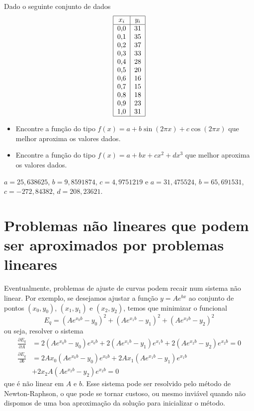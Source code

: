 \documentclass[main.tex]{subfiles}
\begin{document}
\begin{Exercise} Dado o seguinte conjunto de dados
  \begin{equation*}
    \begin{tabular}{|c|c|}
      \hline
      $x_i$ & $y_i$\\
      \hline
      0,0 &  31\\
      0,1 &  35\\
      0,2 &  37\\
      0,3 &  33\\
      0,4 &  28\\
      0,5 &  20\\
      0,6 &  16\\
      0,7 &  15\\
      0,8 &  18\\
      0,9 &  23\\
      1,0 &  31\\
      \hline
    \end{tabular}    
  \end{equation*}
\begin{itemize}
\item Encontre a função do tipo $f(x)=a+b\sin(2\pi x)+c\cos(2\pi x)$ que melhor aproxima os valores dados.
\item Encontre a função do tipo $f(x)=a+bx+cx^2+dx^3$ que melhor aproxima os valores dados.
\end{itemize}
\end{Exercise}
\begin{Answer}
  \begin{tiny}
      $a=25,638625$, $b=9,8591874$, $c=4,9751219$ e   $a=31,475524$, $b=65,691531$, $c=-272,84382$, $d=208,23621$.
  \end{tiny}
\end{Answer}

\section{Problemas não lineares que podem ser aproximados por problemas lineares}

Eventualmente, problemas de ajuste de curvas podem recair num sistema não linear. Por exemplo, se desejamos ajustar a função $y=Ae^{bx}$ ao conjunto de pontos $(x_0,y_0)$, $(x_1,y_1)$ e $(x_2,y_2)$, temos que minimizar o funcional
$$
E_q=(Ae^{x_0b}-y_0)^2+(Ae^{x_1b}-y_1)^2+(Ae^{x_2b}-y_2)^2
$$
ou seja, resolver o sistema
\begin{align*}
\frac{\partial E_q}{\partial A} &= 2(Ae^{x_0b}-y_0)e^{x_0b}+2(Ae^{x_1b}-y_1)e^{x_1b}+2(Ae^{x_2b}-y_2)e^{x_2b}=0\\
\frac{\partial E_q}{\partial b} &= 2Ax_0(Ae^{x_0b}-y_0)e^{x_0b} + 2Ax_1(Ae^{x_1b}-y_1)e^{x_1b} \\
&+ 2x_2A(Ae^{x_2b}-y_2)e^{x_2b}=0
\end{align*}
que é não linear em $A$ e $b$. Esse sistema pode ser resolvido pelo método de Newton-Raphson, o que pode se tornar custoso, ou mesmo inviável quando não dispomos de uma boa aproximação da solução para inicializar o método.
\end{document}
